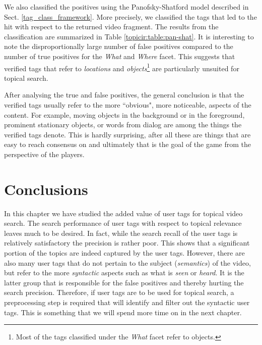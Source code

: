 We also classified the positives using the Panofsky-Shatford model described in Sect. \ref{tag_class_framework}. More precisely, we classified the tags that led to the hit with respect to the returned video fragment. The results from the classification are summarized in Table \ref{topicir:table:pan-shat}. It is interesting to note the disproportionally large number of false positives compared to the number of true positives for the \textit{What} and \textit{Where} facet. This suggests that verified tags that refer to \textit{locations} and \textit{objects}\footnote{Most of the tags classified under the \textit{What} facet refer to objects.}
are particularly unsuited for topical search.

After analysing the true and false positives, the general conclusion is that the verified tags usually refer to the more ``obvious", more noticeable, aspects of the content. For example, moving objects in the background or in the foreground, prominent stationary objects, or words from dialog are among the things the verified tags denote. This is hardly surprising, after all these are things that are easy to reach consensus on and ultimately that is the goal of the game from the perspective of the players. 

\section{Conclusions}\label{sec:topicir:con}
In this chapter we have studied the added value of user tags for topical video search.
The search performance of user tags with respect to topical relevance leaves much to be desired. In fact, while the search recall of the user tags is relatively satisfactory the precision is rather poor. This shows that a significant portion of the topics are indeed captured by the user tags. However, there are also many user tags that do not pertain to the subject (\textit{semantics}) of the video, but refer to the more \textit{syntactic} aspects such as what is \textit{seen} or \textit{heard}. It is the latter group that is responsible for the false positives and thereby hurting the search precision. Therefore, if user tags are to be used for topical search, a preprocessing step is required that will identify and filter out the syntactic user tags. This is something that we will spend more time on in the next chapter.